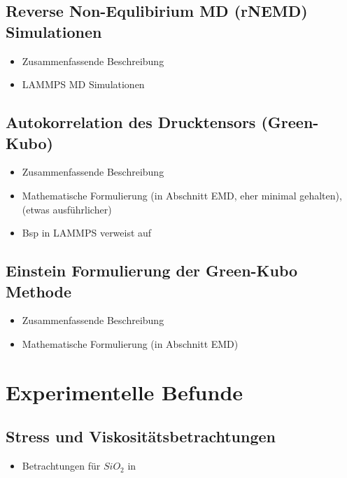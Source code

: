 \documentclass[a4paper, 10pt, 
               numbers=noenddot, toc=graduated,
               headsepline=true, footsepline=true,
               twoside=false, titlepage=true, 
               bibliography=totoc]{scrartcl}
\begin{document}
\subsection{Reverse Non-Equlibirium MD  (rNEMD) Simulationen}
	\begin{itemize}
		 \item Zusammenfassende Beschreibung \cite{Tenney2010} 
		 \item LAMMPS MD Simulationen \cite{Tenney2010} 
	\end{itemize}



\subsection{Autokorrelation des Drucktensors (Green-Kubo)}
	\begin{itemize}
		 \item Zusammenfassende Beschreibung \cite{Tenney2010}
		 \item Mathematische Formulierung  \cite{Tenney2010} (in Abschnitt EMD, eher minimal gehalten), \cite{Kirova2015} (etwas ausführlicher)
		 \item Bsp in LAMMPS verweist auf \cite{Daivis1994}
	\end{itemize}

\subsection{Einstein Formulierung der Green-Kubo Methode}
	\begin{itemize}
		 \item Zusammenfassende Beschreibung \cite{Tenney2010}
		 \item Mathematische Formulierung  \cite{Tenney2010} (in Abschnitt EMD)
	\end{itemize}

\section{Experimentelle Befunde}

\subsection{Stress und Viskositätsbetrachtungen}
	\begin{itemize}
		\item Betrachtungen für $SiO_2$ in \cite{Snoeks2000}
	\end{itemize}






\end{document}
